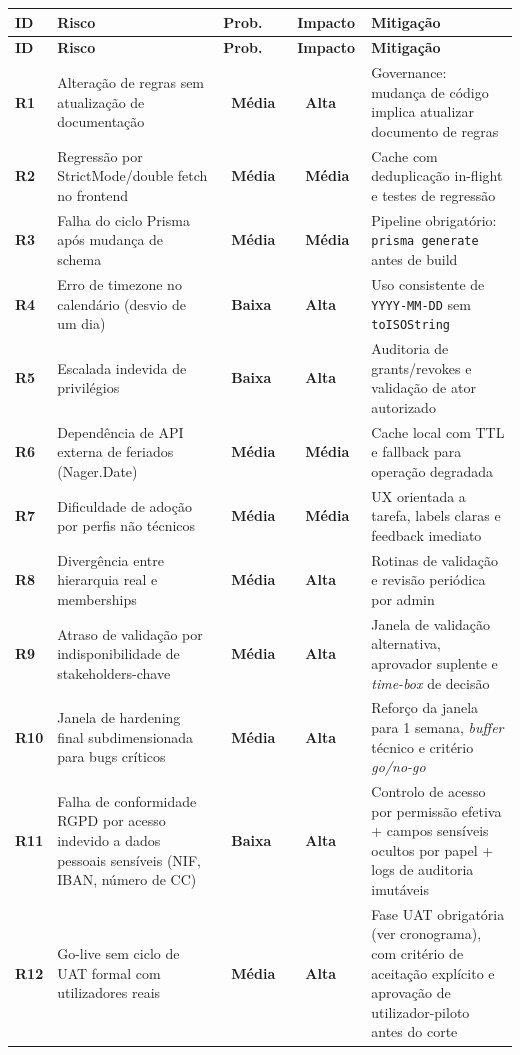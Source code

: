 \documentclass[11pt,a4paper,twoside]{article}
\newcommand{\taghi}  {{\setlength{\fboxsep}{1.5pt}\colorbox{TAGHI}  {\scriptsize\sffamily\bfseries\color{white}~Alta~}}}
\newcommand{\tagmed} {{\setlength{\fboxsep}{1.5pt}\colorbox{TAGMED} {\scriptsize\sffamily\bfseries\color{white}~Média~}}}
\newcommand{\taglo}  {{\setlength{\fboxsep}{1.5pt}\colorbox{TAGLO}  {\scriptsize\sffamily\bfseries\color{white}~Baixa~}}}
\newcommand{\tH}[1]{\textbf{\sffamily\small\color{white}#1}}
\newcommand{\theadrow}{\rowcolor{ACCENT}}
\begin{document}
\begin{longtable}{>{\small\centering\arraybackslash\bfseries}p{0.8cm} >{\small}p{5.4cm} >{\small\centering\arraybackslash}p{1.9cm} >{\small\centering\arraybackslash}p{1.9cm} >{\small}p{3.8cm}}
\theadrow
\tH{ID} & \tH{Risco} & \tH{Prob.} & \tH{Impacto} & \tH{Mitigação} \\
\midrule
\endfirsthead
\theadrow
\tH{ID} & \tH{Risco} & \tH{Prob.} & \tH{Impacto} & \tH{Mitigação} \\
\midrule
\endhead
R1 & Alteração de regras sem atualização de documentação & \tagmed & \taghi & Governance: mudança de código implica atualizar documento de regras \\
R2 & Regressão por StrictMode/double fetch no frontend & \tagmed & \tagmed & Cache com deduplicação in-flight e testes de regressão \\
R3 & Falha do ciclo Prisma após mudança de schema & \tagmed & \tagmed & Pipeline obrigatório: \texttt{prisma generate} antes de build \\
R4 & Erro de timezone no calendário (desvio de um dia) & \taglo & \taghi & Uso consistente de \texttt{YYYY-MM-DD} sem \texttt{toISOString} \\
R5 & Escalada indevida de privilégios & \taglo & \taghi & Auditoria de grants/revokes e validação de ator autorizado \\
R6 & Dependência de API externa de feriados (Nager.Date) & \tagmed & \tagmed & Cache local com TTL e fallback para operação degradada \\
R7 & Dificuldade de adoção por perfis não técnicos & \tagmed & \tagmed & UX orientada a tarefa, labels claras e feedback imediato \\
R8 & Divergência entre hierarquia real e memberships & \tagmed & \taghi & Rotinas de validação e revisão periódica por admin \\
R9 & Atraso de validação por indisponibilidade de stakeholders-chave & \tagmed & \taghi & Janela de validação alternativa, aprovador suplente e \textit{time-box} de decisão \\
R10 & Janela de hardening final subdimensionada para bugs críticos & \tagmed & \taghi & Reforço da janela para 1 semana, \textit{buffer} técnico e critério \textit{go/no-go} \\
R11 & Falha de conformidade RGPD por acesso indevido a dados pessoais sensíveis (NIF, IBAN, número de CC) & \taglo & \taghi & Controlo de acesso por permissão efetiva + campos sensíveis ocultos por papel + logs de auditoria imutáveis \\
R12 & Go-live sem ciclo de UAT formal com utilizadores reais & \tagmed & \taghi & Fase UAT obrigatória (ver cronograma), com critério de aceitação explícito e aprovação de utilizador-piloto antes do corte \\
\bottomrule
\end{longtable}
\end{document}
